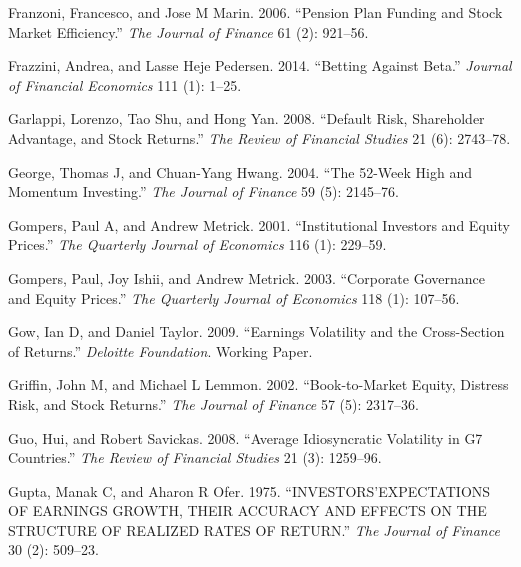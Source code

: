 \documentclass[
  letterpaper,
  DIV=11,
  numbers=noendperiod]{scrreprt}
\newlength{\cslhangindent}
\newlength{\cslentryspacingunit} %
\newenvironment{CSLReferences}[2] %
 {%
  \setlength{\parindent}{0pt}
  \ifodd #1
  \let\oldpar\par
  \def\par{\hangindent=\cslhangindent\oldpar}
  \fi
  \setlength{\parskip}{#2\cslentryspacingunit}
 }%
 {}
\begin{document}
\begin{CSLReferences}{1}{0}
\leavevmode{}%
Franzoni, Francesco, and Jose M Marin. 2006. {``Pension Plan Funding and
Stock Market Efficiency.''} \emph{The Journal of Finance} 61 (2):
921--56.

\leavevmode{}%
Frazzini, Andrea, and Lasse Heje Pedersen. 2014. {``Betting Against
Beta.''} \emph{Journal of Financial Economics} 111 (1): 1--25.

\leavevmode{}%
Garlappi, Lorenzo, Tao Shu, and Hong Yan. 2008. {``Default Risk,
Shareholder Advantage, and Stock Returns.''} \emph{The Review of
Financial Studies} 21 (6): 2743--78.

\leavevmode{}%
George, Thomas J, and Chuan-Yang Hwang. 2004. {``The 52-Week High and
Momentum Investing.''} \emph{The Journal of Finance} 59 (5): 2145--76.

\leavevmode{}%
Gompers, Paul A, and Andrew Metrick. 2001. {``Institutional Investors
and Equity Prices.''} \emph{The Quarterly Journal of Economics} 116 (1):
229--59.

\leavevmode{}%
Gompers, Paul, Joy Ishii, and Andrew Metrick. 2003. {``Corporate
Governance and Equity Prices.''} \emph{The Quarterly Journal of
Economics} 118 (1): 107--56.

\leavevmode{}%
Gow, Ian D, and Daniel Taylor. 2009. {``Earnings Volatility and the
Cross-Section of Returns.''} \emph{Deloitte Foundation}. Working Paper.

\leavevmode{}%
Griffin, John M, and Michael L Lemmon. 2002. {``Book-to-Market Equity,
Distress Risk, and Stock Returns.''} \emph{The Journal of Finance} 57
(5): 2317--36.

\leavevmode{}%
Guo, Hui, and Robert Savickas. 2008. {``Average Idiosyncratic Volatility
in G7 Countries.''} \emph{The Review of Financial Studies} 21 (3):
1259--96.

\leavevmode{}%
Gupta, Manak C, and Aharon R Ofer. 1975. {``INVESTORS'EXPECTATIONS OF
EARNINGS GROWTH, THEIR ACCURACY AND EFFECTS ON THE STRUCTURE OF REALIZED
RATES OF RETURN.''} \emph{The Journal of Finance} 30 (2): 509--23.


\end{CSLReferences}
\end{document}
